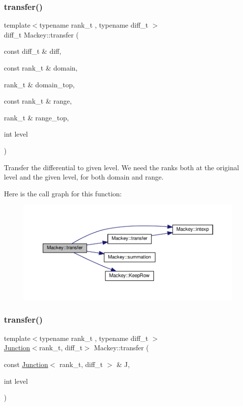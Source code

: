 \subsubsection{\texorpdfstring{transfer()}{transfer()}\hspace{0.1cm}{\footnotesize\ttfamily [2/6]}}
{\footnotesize\ttfamily template$<$typename rank\+\_\+t , typename diff\+\_\+t $>$ \\
diff\+\_\+t Mackey\+::transfer (\begin{DoxyParamCaption}\item[{const diff\+\_\+t \&}]{diff,  }\item[{const rank\+\_\+t \&}]{domain,  }\item[{rank\+\_\+t \&}]{domain\+\_\+top,  }\item[{const rank\+\_\+t \&}]{range,  }\item[{rank\+\_\+t \&}]{range\+\_\+top,  }\item[{int}]{level }\end{DoxyParamCaption})}



Transfer the differential to given level. We need the ranks both at the original level and the given level, for both domain and range. 

Here is the call graph for this function\+:\nopagebreak
\begin{figure}[H]
\begin{center}
\leavevmode
\includegraphics[width=350pt]{namespaceMackey_ad7524839b58c80d4b2c54827e4833b12_cgraph}
\end{center}
\end{figure}
\mbox{\label{namespaceMackey_a914aba7f868e67ae3fd9da3995678660}} 
\subsubsection{\texorpdfstring{transfer()}{transfer()}\hspace{0.1cm}{\footnotesize\ttfamily [3/6]}}
{\footnotesize\ttfamily template$<$typename rank\+\_\+t , typename diff\+\_\+t $>$ \\
\hyperlink{classMackey_1_1Junction}{Junction}$<$rank\+\_\+t, diff\+\_\+t$>$ Mackey\+::transfer (\begin{DoxyParamCaption}\item[{const \hyperlink{classMackey_1_1Junction}{Junction}$<$ rank\+\_\+t, diff\+\_\+t $>$ \&}]{J,  }\item[{int}]{level }\end{DoxyParamCaption})}



